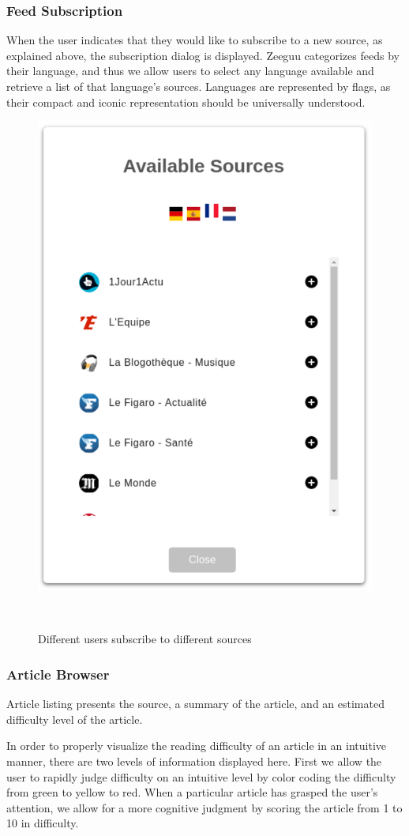 \subsubsection{Feed Subscription}
When the user indicates that they would like to subscribe to a new source, as explained above, the subscription dialog is displayed. Zeeguu categorizes feeds by their language, and thus we allow users to select any language available and retrieve a list of that language's sources. Languages are represented by flags, as their compact and iconic representation should be universally understood.

\begin{figure}[h!]
\centering
  \includegraphics[width=0.4\columnwidth]{figures/available_sources}
  \caption{Different users subscribe to different sources}~\label{fig:registrations}
\end{figure}


\subsubsection{Article Browser}

Article listing presents the source, a summary of the article, and an estimated difficulty level of the article.

In order to properly visualize the reading difficulty of an article in an intuitive manner, there are two levels of information displayed here. First we allow the user to rapidly judge difficulty on an intuitive level by color coding the difficulty from green to yellow to red. When a particular article has grasped the user's attention, we allow for a more cognitive judgment by scoring the article from 1 to 10 in difficulty.

